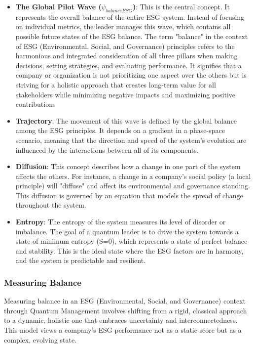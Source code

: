 \documentclass{article}
\begin{document}
\begin{itemize}
\item \textbf{The Global Pilot Wave ($\psi_{balanceESG}$)}: This is the central concept. It represents the overall balance of the entire ESG system. Instead of focusing on individual metrics, the leader manages this wave, which contains all possible future states of the ESG balance. The term "balance" in the context of ESG (Environmental, Social, and Governance) principles refers to the harmonious and integrated consideration of all three pillars when making decisions, setting strategies, and evaluating performance. It signifies that a company or organization is not prioritizing one aspect over the others but is striving for a holistic approach that creates long-term value for all stakeholders while minimizing negative impacts and maximizing positive contributions
\item \textbf{Trajectory}: The movement of this wave is defined by the global balance among the ESG principles. It depends on a gradient in a phase-space scenario, meaning that the direction and speed of the system's evolution are influenced by the interactions between all of its components.
\item \textbf{Diffusion}: This concept describes how a change in one part of the system affects the others. For instance, a change in a company's social policy (a local principle) will "diffuse" and affect its environmental and governance standing. This diffusion is governed by an equation that models the spread of change throughout the system.
\item \textbf{Entropy}: The entropy of the system measures its level of disorder or imbalance. The goal of a quantum leader is to drive the system towards a state of minimum entropy (S=0), which represents a state of perfect balance and stability. This is the ideal state where the ESG factors are in harmony, and the system is predictable and resilient.
\end{itemize}

\subsubsection*{Measuring Balance}
Measuring balance in an ESG (Environmental, Social, and Governance) context through Quantum Management involves shifting from a rigid, classical approach to a dynamic, holistic one that embraces uncertainty and interconnectedness. This model views a company's ESG performance not as a static score but as a complex, evolving state.
\end{document}
